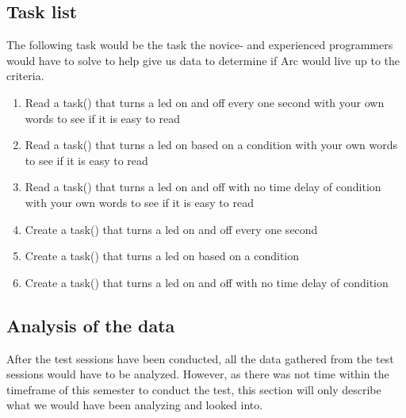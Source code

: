 \subsection{Task list}\label{subsubsec:taskList}
The following task would be the task the novice- and experienced programmers would have to solve to help give us data to determine if Arc would live up to the criteria.
\begin{enumerate} %
    \item Read a task() that turns a led on and off every one second with your own words to see if it is easy to read
    \item Read a task() that turns a led on based on a condition with your own words to see if it is easy to read
    \item Read a task() that turns a led on and off with no time delay of condition with your own words to see if it is easy to read
    \item Create a task() that turns a led on and off every one second
    \item Create a task() that turns a led on based on a condition
    \item Create a task() that turns a led on and off with no time delay of condition
\end{enumerate}

\subsection{Analysis of the data}\label{subsubsec:analysisOfTheData}
After the test sessions have been conducted, all the data gathered from the test sessions would have to be analyzed. However, as there was not time within the timeframe of this semester to conduct the test, this section will only describe what we would have been analyzing and looked into.







